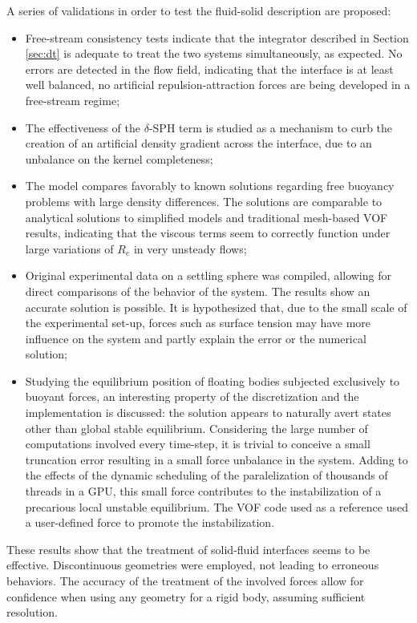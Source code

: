 A series of validations in order to test the fluid-solid description are proposed:

\begin{itemize}
\item Free-stream consistency tests indicate that the integrator described in Section \ref{sec:dt} is adequate to treat the two systems simultaneously, as expected. No errors are detected in the flow field, indicating that the interface is at least well balanced, no artificial repulsion-attraction forces are being developed in a free-stream regime;
\item The effectiveness of the $\delta$-\ac{SPH} term is studied as a mechanism to curb the creation of an artificial density gradient across the interface, due to an unbalance on the kernel completeness;
\item The model compares favorably to known solutions regarding free buoyancy problems with large density differences. The solutions are comparable to analytical solutions to simplified models and traditional mesh-based \ac{VOF} results, indicating that the viscous terms seem to correctly function under large variations of $R_e$ in very unsteady flows;
\item Original experimental data on a settling sphere was compiled, allowing for direct comparisons of the behavior of the system. The results show an accurate solution is possible. It is hypothesized that, due to the small scale of the experimental set-up, forces such as surface tension may have more influence on the system and partly explain the error or the numerical solution;
\item Studying the equilibrium position of floating bodies subjected exclusively to buoyant forces, an interesting property of the discretization and the implementation is discussed: the solution appears to naturally avert states other than global stable equilibrium. Considering the large number of computations involved every time-step, it is trivial to conceive a small truncation error resulting in a small force unbalance in the system. Adding to the effects of the dynamic scheduling of the paralelization of thousands of threads in a \ac{GPU}, this small force contributes to the instabilization of a precarious local unstable equilibrium. The \ac{VOF} code used as a reference used a user-defined force to promote the instabilization.
\end{itemize}
These results show that the treatment of solid-fluid interfaces seems to be effective. Discontinuous geometries were employed, not leading to erroneous behaviors. The accuracy of the treatment of the involved forces allow for confidence when using any geometry for a rigid body, assuming sufficient resolution.

